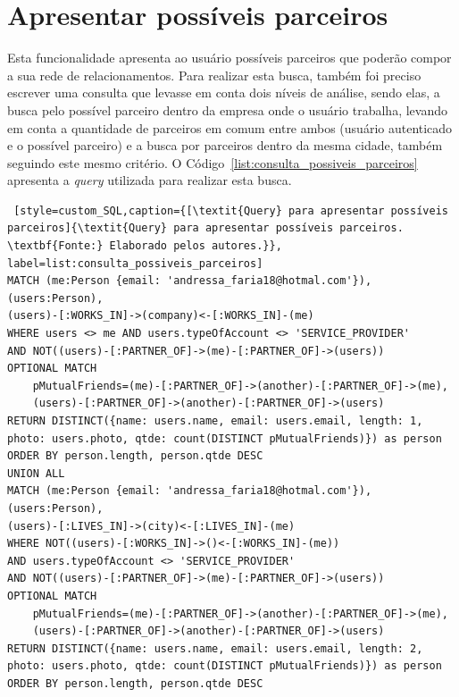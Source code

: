 \section{Apresentar possíveis parceiros}

\par Esta funcionalidade apresenta ao usuário possíveis parceiros que poderão compor a sua rede de relacionamentos. Para realizar esta busca, também foi preciso escrever uma consulta que levasse em conta dois níveis de análise, sendo elas, a busca pelo possível parceiro dentro da empresa onde o usuário trabalha, levando em conta a quantidade de parceiros em comum entre ambos (usuário autenticado e o possível parceiro) e a busca por parceiros dentro da mesma cidade, também seguindo este mesmo critério. O Código~\ref{list:consulta_possiveis_parceiros} apresenta a \textit{query} utilizada para realizar esta busca.

\begin{lstlisting} [style=custom_SQL,caption={[\textit{Query} para apresentar possíveis parceiros]{\textit{Query} para apresentar possíveis parceiros. \textbf{Fonte:} Elaborado pelos autores.}}, label=list:consulta_possiveis_parceiros] 	
MATCH (me:Person {email: 'andressa_faria18@hotmal.com'}), (users:Person),
(users)-[:WORKS_IN]->(company)<-[:WORKS_IN]-(me)
WHERE users <> me AND users.typeOfAccount <> 'SERVICE_PROVIDER'
AND NOT((users)-[:PARTNER_OF]->(me)-[:PARTNER_OF]->(users)) 
OPTIONAL MATCH
	pMutualFriends=(me)-[:PARTNER_OF]->(another)-[:PARTNER_OF]->(me),
	(users)-[:PARTNER_OF]->(another)-[:PARTNER_OF]->(users)
RETURN DISTINCT({name: users.name, email: users.email, length: 1, 
photo: users.photo, qtde: count(DISTINCT pMutualFriends)}) as person
ORDER BY person.length, person.qtde DESC
UNION ALL
MATCH (me:Person {email: 'andressa_faria18@hotmal.com'}), (users:Person),
(users)-[:LIVES_IN]->(city)<-[:LIVES_IN]-(me)
WHERE NOT((users)-[:WORKS_IN]->()<-[:WORKS_IN]-(me))
AND users.typeOfAccount <> 'SERVICE_PROVIDER'
AND NOT((users)-[:PARTNER_OF]->(me)-[:PARTNER_OF]->(users))
OPTIONAL MATCH 
	pMutualFriends=(me)-[:PARTNER_OF]->(another)-[:PARTNER_OF]->(me),
	(users)-[:PARTNER_OF]->(another)-[:PARTNER_OF]->(users)
RETURN DISTINCT({name: users.name, email: users.email, length: 2, 
photo: users.photo, qtde: count(DISTINCT pMutualFriends)}) as person
ORDER BY person.length, person.qtde DESC
\end{lstlisting}


